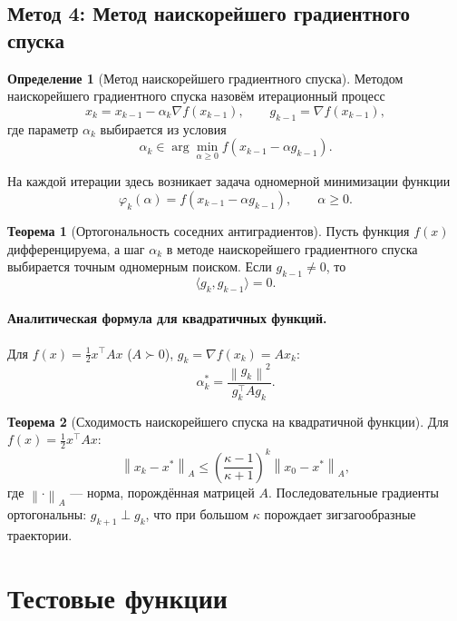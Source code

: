 \documentclass[a4paper,12pt]{article}
\newcommand{\norm}[1]{\left\|#1\right\|}
\newcommand{\grad}{\nabla}
\theoremstyle{definition}
\newtheorem{definition}{Определение}[section]
\newtheorem{theorem}{Теорема}[section]
\begin{document}
\subsection{Метод 4: Метод наискорейшего градиентного спуска}

\begin{definition}[Метод наискорейшего градиентного спуска]
    Методом наискорейшего градиентного спуска назовём итерационный процесс
    \[
        x_k = x_{k-1} - \alpha_k \grad f(x_{k-1}), \qquad g_{k-1} = \grad f(x_{k-1}),
    \]
    где параметр $\alpha_k$ выбирается из условия
    \[
        \alpha_k \in \arg\min_{\alpha \geq 0} f(x_{k-1} - \alpha g_{k-1}).
    \]
\end{definition}

На каждой итерации здесь возникает задача одномерной минимизации функции
\[
    \varphi_k(\alpha) = f(x_{k-1} - \alpha g_{k-1}), \qquad \alpha \geq 0.
\]

\begin{theorem}[Ортогональность соседних антиградиентов]
    Пусть функция $f(x)$ дифференцируема, а шаг $\alpha_k$ в методе наискорейшего
    градиентного спуска выбирается точным одномерным поиском. Если $g_{k-1} \neq 0$, то
    \[
        \langle g_k, g_{k-1} \rangle = 0.
    \]
\end{theorem}

\paragraph{Аналитическая формула для квадратичных функций.}
Для $f(x) = \tfrac{1}{2} x^\top A x$ ($A \succ 0$), $g_k = \grad f(x_k) = A x_k$:
\begin{equation}
    \label{eq:optimal_alpha_quad}
    \boxed{\alpha_k^* = \frac{\norm{g_k}^2}{g_k^\top A g_k}.}
\end{equation}

\begin{theorem}[Сходимость наискорейшего спуска на квадратичной функции]
    Для $f(x) = \tfrac{1}{2} x^\top A x$:
    \[
        \norm{x_k - x^*}_A \leq \left( \frac{\kappa - 1}{\kappa + 1} \right)^k \norm{x_0 - x^*}_A,
    \]
    где $\norm{\cdot}_A$ — норма, порождённая матрицей $A$. Последовательные градиенты ортогональны:
    $g_{k+1} \perp g_k$, что при большом $\kappa$ порождает зигзагообразные траектории.
\end{theorem}

\section{Тестовые функции}
\end{document}

